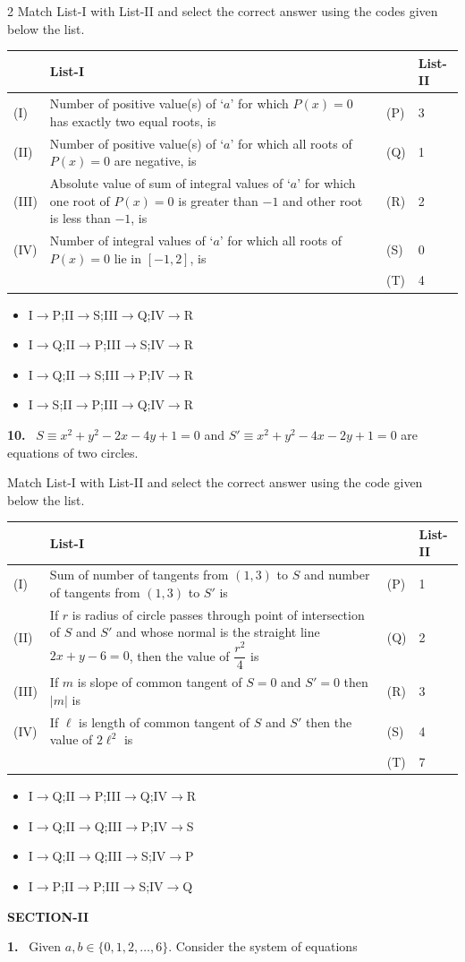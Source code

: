 \documentclass[10pt]{extarticle}
\newcommand{\sect}[1]{\par\smallskip\noindent\textbf{#1}\par}
\newcommand{\qn}[1]{\par\smallskip\noindent\textbf{#1.}~}
\newenvironment{qoptions}{\begin{itemize}[leftmargin=1.8em,itemsep=1pt,topsep=2pt,label={}]}{\end{itemize}}
\newcommand{\opt}[2]{\item[(#1)] #2}
\begin{document}
\begin{multicols}{2}
Match List-I with List-II and select the correct answer using the codes given below the list.

{\footnotesize\setlength{\tabcolsep}{2pt}
\begin{tabular}{|l|p{4.6cm}|l|l|}
\hline
 & List-I & & List-II\\
\hline
(I) & Number of positive value(s) of `$a$' for which $P(x)=0$ has exactly two equal roots, is & (P) & 3\\
(II) & Number of positive value(s) of `$a$' for which all roots of $P(x)=0$ are negative, is & (Q) & 1\\
(III) & Absolute value of sum of integral values of `$a$' for which one root of $P(x)=0$ is greater than $-1$ and other root is less than $-1$, is & (R) & 2\\
(IV) & Number of integral values of `$a$' for which all roots of $P(x)=0$ lie in $[-1,2]$, is & (S) & 0\\
 & & (T) & 4\\
\hline
\end{tabular}}
\begin{qoptions}
\opt{A}{I$\to$P;II$\to$S;III$\to$Q;IV$\to$R}
\opt{B}{I$\to$Q;II$\to$P;III$\to$S;IV$\to$R}
\opt{C}{I$\to$Q;II$\to$S;III$\to$P;IV$\to$R}
\opt{D}{I$\to$S;II$\to$P;III$\to$Q;IV$\to$R}
\end{qoptions}
\qn{10} $S\equiv x^2+y^2-2x-4y+1=0$ and $S'\equiv x^2+y^2-4x-2y+1=0$ are equations of two circles.

Match List-I with List-II and select the correct answer using the code given below the list.

{\footnotesize\setlength{\tabcolsep}{2pt}
\begin{tabular}{|l|p{4.6cm}|l|l|}
\hline
 & List-I & & List-II\\
\hline
(I) & Sum of number of tangents from $(1,3)$ to $S$ and number of tangents from $(1,3)$ to $S'$ is & (P) & 1\\
(II) & If $r$ is radius of circle passes through point of intersection of $S$ and $S'$ and whose normal is the straight line $2x+y-6=0$, then the value of $\dfrac{r^2}4$ is & (Q) & 2\\
(III) & If $m$ is slope of common tangent of $S=0$ and $S'=0$ then $|m|$ is & (R) & 3\\
(IV) & If $\ell$ is length of common tangent of $S$ and $S'$ then the value of $2\ell^2$ is & (S) & 4\\
 & & (T) & 7\\
\hline
\end{tabular}}
\begin{qoptions}
\opt{A}{I$\to$Q;II$\to$P;III$\to$Q;IV$\to$R}
\opt{B}{I$\to$Q;II$\to$Q;III$\to$P;IV$\to$S}
\opt{C}{I$\to$Q;II$\to$Q;III$\to$S;IV$\to$P}
\opt{D}{I$\to$P;II$\to$P;III$\to$S;IV$\to$Q}
\end{qoptions}
\sect{SECTION-II}
\qn{1} Given $a,b\in\{0,1,2,\ldots,6\}$. Consider the system of equations


\end{multicols}
\end{document}
